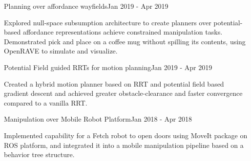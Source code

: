 
\begin{cventries}

\cventrybasic
    {Planning over affordance wayfields}{Jan 2019 - Apr 2019}
    {
      \begin{cvitems}
      \item Explored null-space subsumption architecture to create planners over potential-based affordance representations achieve constrained manipulation tasks. Demonstrated pick and place on a coffee mug without spilling its contents, using OpenRAVE to simulate and visualize.
    \end{cvitems}
    }
    
\cventrybasic
    {Potential Field guided RRTs for motion planning}{Jan 2019 - Apr 2019}
    {
      \begin{cvitems}
      \item Created a hybrid motion planner based on RRT and potential field based gradient descent and achieved greater obstacle-clearance and faster convergence compared to a vanilla RRT.
    \end{cvitems}
    }
    
\cventrybasic
    {Manipulation over Mobile Robot Platform}{Jan 2018 - Apr 2018}
    {
      \begin{cvitems}
      \item Implemented capability for a Fetch robot to open doors using MoveIt package on ROS platform, and integrated it into a mobile manipulation pipeline based on a behavior tree structure.
      \end{cvitems}
    }
\end{cventries}
